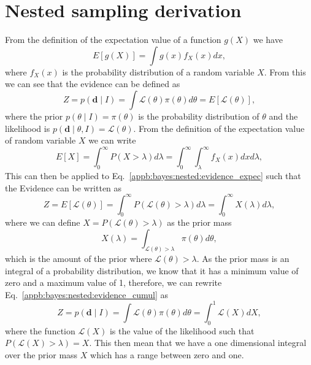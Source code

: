 \chapter{\label{appb} Nested sampling derivation}

From the definition of the expectation value of a function $g(X)$ we
have
\begin{equation}
  \label{appb:bayes:nested:exectationg}
  E[ g(X) ] = \int g(x) f_X(x) dx,
\end{equation}
where $f_X(x)$ is the probability distribution of a random variable
$X$.
From this we can see that the evidence can be defined as
\begin{equation}
  \label{appb:bayes:nested:evidence_expec}
  Z = p(\bm{d} \mid I) = \int \mathcal{L}(\theta) \pi(\theta) d\theta
  = E [ \mathcal{L}(\theta)],
\end{equation}
where the prior $p(\theta \mid I) = \pi(\theta)$ is the probability
distribution of $\theta$ and the likelihood is $p(\bm{d} \mid \theta,
I) = \mathcal{L}(\theta)$.
From the definition of the expectation value of random variable $X$ we
can write
\begin{equation}
  \label{appb:bayes:nested:exectationx}
  E[X] = \int_0^{\infty} P(X > \lambda) d\lambda = \int_0^{\infty}
  \int_{\lambda}^{\infty} f_X(x) dx d\lambda,
\end{equation}
This can then be applied to
Eq.~\ref{appb:bayes:nested:evidence_expec} such that the Evidence
can be written as
\begin{equation}
  \label{appb:bayes:nested:evidence_cumul}
  Z = E[\mathcal{L}(\theta)] = \int_0^{\infty}  P(\mathcal{L}(\theta)
  > \lambda) d\lambda = \int_0^{\infty}  X(\lambda) d\lambda ,
\end{equation}
where we can define $X = P(\mathcal{L}(\theta) > \lambda)$ as the
prior mass
\begin{equation}
  \label{appb:bayes:nested:priormass}
  X(\lambda) = \int_{\mathcal{L}(\theta) > \lambda} \pi(\theta)
  d\theta,
\end{equation}
which is the amount of the prior where $\mathcal{L}(\theta) >
\lambda$.
As the prior mass is an integral of a probability distribution, we
know that it has a minimum value of zero and a maximum value of 1,
therefore, we can rewrite
Eq.~\ref{appb:bayes:nested:evidence_cumul} as
\begin{equation}
  \label{appb:bayes:nested:evidence}
  Z = p(\bm{d} \mid I) = \int \mathcal{L}(\theta) \pi(\theta) d\theta
  = \int_0^1 \mathcal{L}(X) dX,
\end{equation}
where the function $\mathcal{L}(X)$ is the value of the likelihood
such that $P(\mathcal{L}(X) > \lambda) = X$.
This then mean that we have a one dimensional integral over the prior
mass $X$ which has a range between zero and one.
